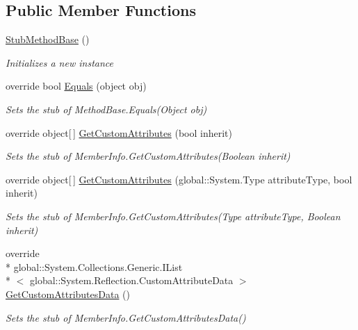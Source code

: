 \subsection*{Public Member Functions}
\begin{DoxyCompactItemize}
\item 
\hyperlink{class_system_1_1_reflection_1_1_fakes_1_1_stub_method_base_ac578a092c9759b02ac1fd09acdbd8ec0}{Stub\-Method\-Base} ()
\begin{DoxyCompactList}\small\item\em Initializes a new instance\end{DoxyCompactList}\item 
override bool \hyperlink{class_system_1_1_reflection_1_1_fakes_1_1_stub_method_base_adde5e60fa8e38b92b3f71de8777572ad}{Equals} (object obj)
\begin{DoxyCompactList}\small\item\em Sets the stub of Method\-Base.\-Equals(\-Object obj)\end{DoxyCompactList}\item 
override object\mbox{[}$\,$\mbox{]} \hyperlink{class_system_1_1_reflection_1_1_fakes_1_1_stub_method_base_a8f1543241c55b969b6c66c0417c5fd05}{Get\-Custom\-Attributes} (bool inherit)
\begin{DoxyCompactList}\small\item\em Sets the stub of Member\-Info.\-Get\-Custom\-Attributes(\-Boolean inherit)\end{DoxyCompactList}\item 
override object\mbox{[}$\,$\mbox{]} \hyperlink{class_system_1_1_reflection_1_1_fakes_1_1_stub_method_base_a25c0f53a14184835184885583f40dd22}{Get\-Custom\-Attributes} (global\-::\-System.\-Type attribute\-Type, bool inherit)
\begin{DoxyCompactList}\small\item\em Sets the stub of Member\-Info.\-Get\-Custom\-Attributes(\-Type attribute\-Type, Boolean inherit)\end{DoxyCompactList}\item 
override \\*
global\-::\-System.\-Collections.\-Generic.\-I\-List\\*
$<$ global\-::\-System.\-Reflection.\-Custom\-Attribute\-Data $>$ \hyperlink{class_system_1_1_reflection_1_1_fakes_1_1_stub_method_base_a4a977da99fd1d502ba71f880e6977889}{Get\-Custom\-Attributes\-Data} ()
\begin{DoxyCompactList}\small\item\em Sets the stub of Member\-Info.\-Get\-Custom\-Attributes\-Data()\end{DoxyCompactList}\item 

\end{DoxyCompactItemize}
